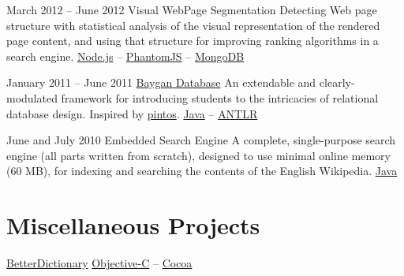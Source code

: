 \documentclass{tccv}
\begin{document}
\begin{project_list}
\vspace{-6pt}

\item{March 2012 -- June 2012}
     {}
     {Visual WebPage Segmentation}
	 {Detecting Web page structure with statistical \mbox{analysis} of the visual representation of the rendered page \mbox{content}, and using that structure for improving ranking algorithms in a search engine.%
}
	 {%
	 	\href{http://nodejs.org}{Node.js} -- %
		\href{http://phantomjs.org}{PhantomJS} -- %
		\href{http://www.mongodb.org}{MongoDB}%
	 }

\vspace{-6pt}

\item{January 2011 -- June 2011}
	 {}
	 {\vspace{-14pt}\href{https://github.com/baygan/Baygan}{Baygan Database}}
	 {An extendable and clearly-modulated framework for introducing students to the intricacies of relational database design. Inspired by \href{http://www.stanford.edu/class/cs140/projects/pintos/pintos.html}{pintos}.%
}
	 {%
	 	\href{http://www.oracle.com/technetwork/java/}{Java} -- %
		\href{http://www.antlr.org}{ANTLR}%
	 }

\vspace{-14pt}
	 
\item{June and July 2010}
	 {}
	 {Embedded Search Engine}
	 {A complete, single-purpose search engine (all parts \mbox{written} from scratch), designed to use minimal online memory (60 MB), for indexing and searching the contents of the English Wikipedia.}
	 {%
		 \href{http://www.oracle.com/technetwork/java/}{Java}%
	 }

\end{project_list}

\vspace{-20pt}


\section{Miscellaneous Projects}

\begin{oneline_projects}

\item{\href{https://github.com/pooriaazimi/BetterDictionary}{BetterDictionary}}
	 {%
	 	\href{https://en.wikipedia.org/wiki/Objective-C}{Objective-C} -- %
		\href{https://en.wikipedia.org/wiki/Cocoa_(API)}{Cocoa}%
	 }	

\end{oneline_projects}
\end{document}
